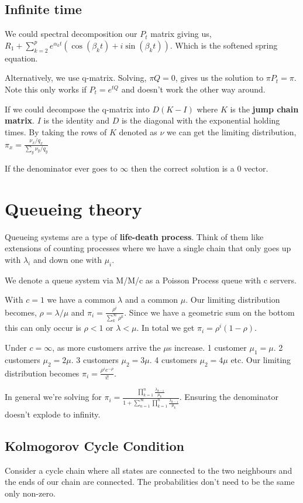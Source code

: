 \documentclass[10pt,landscape,a4paper]{article}
\begin{document}
\begin{multicols*}{4}
\subsection{Infinite time}
We could spectral decomposition our $P_t$ matrix giving us,
$R_1 + \sum_{k=2}^p e^{\alpha_k t} (\cos(\beta_k t) + i \sin(\beta_k t))$.
Which is the softened spring equation.

Alternatively, we use q-matrix. Solving, $\pi Q = 0$, gives us the solution to
$\pi P_t = \pi$. Note this only works if $P_t = e^{tQ}$ and doesn't work the
other way around.

If we could decompose the q-matrix into $D(K-I)$ where $K$ is the
\textbf{jump chain matrix}. $I$ is the identity and $D$ is the diagonal
with the exponential holding times. By taking the rows of $K$ denoted as
$\nu$ we can get the limiting distribution, \\
$\pi_x = \frac{\nu_x/q_x}{\sum_y \nu_y/q_y}$

If the denominator ever goes to $\infty$ then the correct solution is a 0 vector.
\section{Queueing theory}
Queueing systems are a type of \textbf{life-death process}.
Think of them like extensions
of counting processes where we have a single chain that only goes up with $\lambda_i$
and down one with $\mu_i$.

We denote a queue system via M/M/c as a Poisson Process queue with c servers.

With $c=1$ we have a common $\lambda$ and a common $\mu$. Our limiting distribution
becomes,
$\rho = \lambda/\mu$ and $\pi_i = \frac{\rho^i}{\sum_k^\infty \rho^k}$.
Since we have a geometric sum on the bottom this can only occur is $\rho < 1$ or
$\lambda < \mu$. In total we get $\pi_i = \rho^i(1 - \rho)$.

Under $c=\infty$, as more customers arrive the $\mu$s increase.
1 customer $\mu_1 = \mu$. 2 customers $\mu_2 = 2\mu$.
3 customers $\mu_2 = 3\mu$. 4 customers $\mu_2 = 4\mu$ etc. Our limiting distribution
becomes $\pi_i = \frac{\rho^i e^{-\rho}}{i!}$.

In general we're solving for
$\pi_i = \frac{\prod_{k=1}^n \frac{\lambda_{k-1}}{\mu_k}}{1+\sum_{n=1}^\infty \prod_{k=1}^n \frac{\lambda_{k-1}}{\mu_k}}$.
Ensuring the denominator doesn't explode to infinity.

\subsection{Kolmogorov Cycle Condition}
Consider a cycle chain where all states are connected to the two neighbours
and the ends of our chain are connected. The probabilities don't need to be the
same only non-zero.


\end{multicols*}
\end{document}
